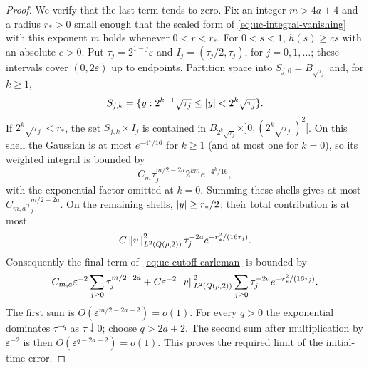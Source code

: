 \documentclass[11pt,letterpaper]{article}
\numberwithin{equation}{section}
\theoremstyle{plain}
\theoremstyle{definition}
\theoremstyle{remark}
\begin{document}
\begin{proof}
We verify that the last term tends to zero. Fix an integer $m>4a+4$ and a
radius $r_*>0$ small enough that the scaled form of
\eqref{eq:uc-integral-vanishing} with this exponent $m$ holds whenever
$0<r<r_*$. For $0<s<1$, $h(s)\geq c s$ with an absolute $c>0$. Put
$\tau_j=2^{1-j}\varepsilon$ and
$I_j=(\tau_j/2,\tau_j)$, for $j=0,1,\ldots$; these intervals cover
$(0,2\varepsilon)$ up to endpoints. Partition space into
$S_{j,0}=B_{\sqrt{\tau_j}}$ and, for $k\geq1$,
\[
 S_{j,k}=\{y:2^{k-1}\sqrt{\tau_j}\leq\left\lvert y\right\rvert<
                                  2^k\sqrt{\tau_j}\}.
\]
If $2^k\sqrt{\tau_j}< r_*$, the set
$S_{j,k}\times I_j$ is contained in
$B_{2^k\sqrt{\tau_j}}\times]0,(2^k\sqrt{\tau_j})^2[$. On this shell the
Gaussian is at most $e^{-4^k/16}$ for $k\geq1$ (and at most one for $k=0$),
so its weighted integral is bounded by
\[
 C_m\tau_j^{m/2-2a}2^{km}e^{-4^k/16},
\]
with the exponential factor omitted at $k=0$. Summing these shells gives at
most $C_{m,a}\tau_j^{m/2-2a}$. On the remaining shells,
$\left\lvert y\right\rvert\geq r_*/2$; their total contribution is at most
\[
 C\left\lVert v\right\rVert_{L^2(Q(\rho,2))}^2\tau_j^{-2a}
          e^{-r_*^2/(16\tau_j)}.
\]
Consequently the final term of~\eqref{eq:uc-cutoff-carleman} is bounded by
\[
 C_{m,a}\varepsilon^{-2}\sum_{j\geq0}\tau_j^{m/2-2a}
 +C\varepsilon^{-2}\left\lVert v\right\rVert_{L^2(Q(\rho,2))}^2
       \sum_{j\geq0}\tau_j^{-2a}e^{-r_*^2/(16\tau_j)}.
\]
The first sum is
$O(\varepsilon^{m/2-2a-2})=o(1)$. For every $q>0$ the exponential
dominates $\tau^{-q}$ as $\tau\downarrow0$; choose $q>2a+2$. The second
sum after multiplication by $\varepsilon^{-2}$ is then
$O(\varepsilon^{q-2a-2})=o(1)$. This proves the required limit of the
initial-time error.


\end{proof}
\end{document}
